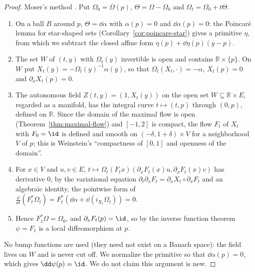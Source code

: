 \begin{proof}
  \leanok
  Moser's method \cite[\S4, Theorem~2]{Mos65}. Put $\Omega_0 = \Omega(p)$, $\Theta = \Omega -
  \Omega_0$ and $\Omega_t = \Omega_0 + t\Theta$.
  \begin{enumerate}
    \item On a ball $B$ around $p$, $\Theta = \dd\alpha$ with $\alpha(p) = 0$ and
      $\dd\alpha(p) = 0$: the Poincaré lemma for star-shaped sets
      (Corollary~\ref{cor:poincare-star}) gives a primitive $\eta$, from which we subtract the
      closed affine form $\eta(p) + \dd\eta(p)(y - p)$.
    \item The set $W$ of $(t, y)$ with $\Omega_t(y)$ invertible is open and contains
      $\mathbb{R} \times \{p\}$. On $W$ put $X_t(y) = -\Omega_t(y)^{-1}\alpha(y)$, so that
      $\Omega_t(X_t, \cdot) = -\alpha$, $X_t(p) = 0$ and $\partial_x X_t(p) = 0$.
    \item The autonomous field $Z(t, y) = (1, X_t(y))$ on the open set $W \subseteq \mathbb{R}
      \times E$, regarded as a manifold, has the integral curve $t \mapsto (t, p)$ through
      $(0, p)$, defined on $\mathbb{R}$. Since the domain of the maximal flow is open
      (Theorem~\ref{thm:maximal-flow}) and $[-1, 2]$ is compact, the flow $F_t$ of $X_t$ with
      $F_0 = \id$ is defined and smooth on $(-\delta, 1 + \delta) \times V$ for a neighborhood
      $V$ of $p$; this is Weinstein's ``compactness of $[0, 1]$ and openness of the domain''.
    \item For $x \in V$ and $u, v \in E$, $t \mapsto \Omega_t(F_t x)(\partial_x F_t(x) u,
      \partial_x F_t(x) v)$ has derivative $0$, by the variational equation
      $\partial_t \partial_x F_t = \partial_x X_t \circ \partial_x F_t$ and an algebraic identity,
      the pointwise form of $\frac{\dd}{\dd t}(F_t^*\Omega_t) = F_t^*(\dd\alpha +
      \dd(i_{X_t}\Omega_t)) = 0$.
    \item Hence $F_1^*\Omega = \Omega_0$, and $\partial_x F_t(p) = \id$, so by the inverse
      function theorem $\psi = F_1$ is a local diffeomorphism at $p$.
  \end{enumerate}
  No bump functions are used (they need not exist on a Banach space): the field lives on $W$ and
  is never cut off. We normalize the primitive so that $\dd\alpha(p) = 0$, which gives
  $\dd\psi(p) = \id$. We do not claim this argument is new.
\end{proof}

